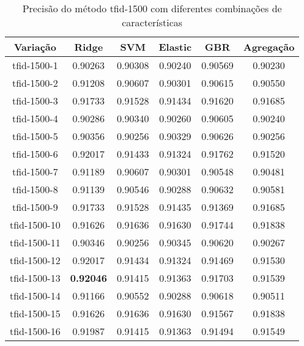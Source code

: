 \begin{table}[H]
\label{tab:precisiontfid1500}
\centering
\begin{tabular}{|c| c c  c  c  c| }
\hline
Variação &  Ridge & SVM & Elastic & GBR & Agregação  \\ 
\hline
tfid-1500-1 & 0.90263 & 0.90308 & 0.90240 & 0.90569 & 0.90230 \\
\hline
tfid-1500-2 & 0.91208 & 0.90607 & 0.90301 & 0.90615 & 0.90550 \\
\hline
tfid-1500-3 & 0.91733 & 0.91528 & 0.91434 & 0.91620 & 0.91685 \\
\hline
tfid-1500-4 & 0.90286 & 0.90340 & 0.90260 & 0.90605 & 0.90240 \\
\hline
tfid-1500-5 & 0.90356 & 0.90256 & 0.90329 & 0.90626 & 0.90256 \\
\hline
tfid-1500-6 & 0.92017 & 0.91433 & 0.91324 & 0.91762 & 0.91520 \\
\hline
tfid-1500-7 & 0.91189 & 0.90607 & 0.90301 & 0.90548 & 0.90481 \\
\hline
tfid-1500-8 & 0.91139 & 0.90546 & 0.90288 & 0.90632 & 0.90581 \\
\hline
tfid-1500-9 & 0.91733 & 0.91528 & 0.91435 & 0.91369 & 0.91685 \\
\hline
tfid-1500-10 & 0.91626 & 0.91636 & 0.91630 & 0.91744 & 0.91838 \\
\hline
tfid-1500-11 & 0.90346 & 0.90256 & 0.90345 & 0.90620 & 0.90267 \\
\hline
tfid-1500-12 & 0.92017 & 0.91434 & 0.91324 & 0.91469 & 0.91530 \\
\hline
tfid-1500-13 & \textbf{0.92046} & 0.91415 & 0.91363 & 0.91703 & 0.91539 \\
\hline
tfid-1500-14 & 0.91166 & 0.90552 & 0.90288 & 0.90618 & 0.90511 \\
\hline
tfid-1500-15 & 0.91626 & 0.91636 & 0.91630 & 0.91567 & 0.91838 \\
\hline
tfid-1500-16 & 0.91987 & 0.91415 & 0.91363 & 0.91494 & 0.91549 \\
\hline
\end{tabular}
\caption{Precisão do método tfid-1500 com diferentes combinações de características}
\end{table}

